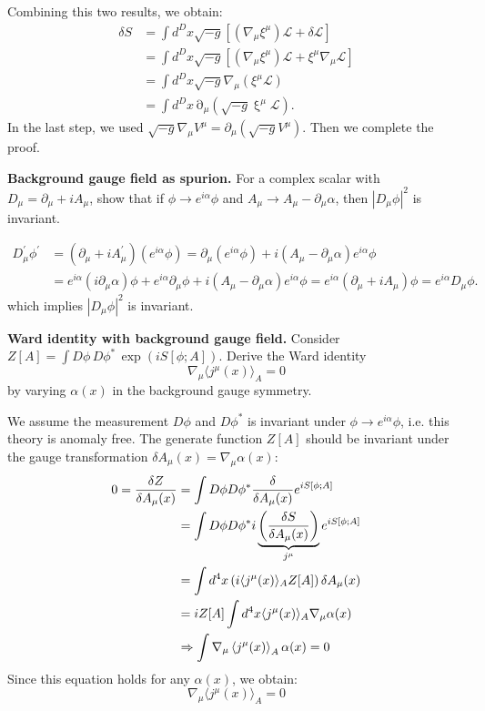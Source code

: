 \begin{solution}[26.1]
\[	\]
	Combining this two results, we obtain:
	\[
	\begin{aligned}\delta S&=\int d^Dx\sqrt{-g}{\left[(\nabla_\mu\xi^\mu)\mathcal{L}+\delta\mathcal{L}\right]}\\&=\int d^Dx\sqrt{-g}{\left[(\nabla_\mu\xi^\mu)\mathcal{L}+\xi^\mu\nabla_\mu\mathcal{L}\right]}\\&=\int d^Dx\sqrt{-g}\nabla_\mu(\xi^\mu\mathcal{L})\\&=\int d^Dx\operatorname{\partial}_\mu\left(\sqrt{-g}\operatorname{\xi}^\mu\mathcal{L}\right).\end{aligned}
	\]
	In the last step, we used $\sqrt{-g}\nabla_\mu V^\mu=\partial_\mu(\sqrt{-g}V^\mu)$. Then we complete the proof.
\end{solution}
\begin{problem}
    \textbf{Background gauge field as spurion.} For a complex scalar with \(D_\mu=\partial_\mu+iA_\mu\), show that if \(\phi\to e^{i\alpha}\phi\) and \(A_\mu\to A_\mu-\partial_\mu\alpha\), then \(|D_\mu\phi|^2\) is invariant.
\end{problem}
\begin{solution}[26.2]
	\[
	\begin{aligned}
			D_\mu^\prime\phi^\prime&=(\partial_\mu+iA_\mu^\prime)(e^{i\alpha}\phi)=\partial_\mu(e^{i\alpha}\phi)+i(A_\mu-\partial_\mu\alpha)e^{i\alpha}\phi\\
		&=e^{i\alpha}(i\partial_\mu\alpha)\phi+e^{i\alpha}\partial_\mu\phi+i(A_\mu-\partial_\mu\alpha)e^{i\alpha}\phi=e^{i\alpha}(\partial_\mu+iA_\mu)\phi=e^{i\alpha}D_\mu\phi.
	\end{aligned}
	\]
	which implies $|D_\mu\phi|^2$ is invariant.
\end{solution}
\begin{problem}
    \textbf{Ward identity with background gauge field.} Consider \(Z[A]=\int D\phi\,D\phi^*\,\exp(iS[\phi;A])\). Derive the Ward identity
    \[
        \nabla_\mu\langle j^\mu(x)\rangle_A=0
    \]
    by varying \(\alpha(x)\) in the background gauge symmetry.
\end{problem}
\begin{solution}[26.3]
	We assume the measurement $D\phi$ and $D\phi^*$ is invariant under $\phi\to e^{i\alpha}\phi$, i.e. this theory is anomaly free. The generate function $Z[A]$ should be invariant under the gauge transformation $\delta A_{\mu}(x)=\nabla_\mu \alpha(x)$:
	\[
	\begin{aligned}
		0=\frac{\delta Z}{\delta A_\mu(x)}&=\int D\phi D\phi^*\frac{\delta}{\delta A_\mu(x)}e^{iS[\phi;A]}\\&=\int D\phi D\phi^*i\underbrace{\left(\frac{\delta S}{\delta A_\mu(x)}\right)}_{j^\mu}e^{iS[\phi;A]}\\
		&=\int d^4x\left(i\langle j^\mu(x)\rangle_AZ[A]\right)\delta A_\mu(x)\\
		&=iZ[A]\int d^4x\langle j^\mu(x)\rangle_A\nabla_\mu\alpha(x)\\
		&\Rightarrow\int\nabla_\mu \braket{j^\mu(x)}_A\alpha(x)=0
		\end{aligned}
	\]
	Since this equation holds for any $\alpha(x)$, we obtain:
	\[
	\boxed{
	\nabla_\mu\langle j^\mu(x)\rangle_A=0
}
	\]
\end{solution}
